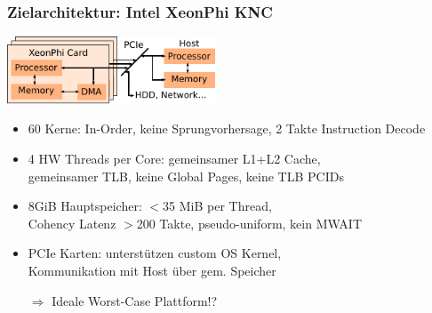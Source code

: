\begin{frame}
  \frametitle{Zielarchitektur: Intel XeonPhi KNC}

  \begin{center}
    \includegraphics[height=2cm]{figures/hw-xeonphi-host}
  \end{center}

  \begin{itemize}
  \item 60 Kerne: In-Order, keine Sprungvorhersage, 2 Takte Instruction Decode
  \item 4 HW Threads per Core: gemeinsamer L1+L2 Cache,\\ 
    gemeinsamer TLB, keine Global Pages, keine TLB PCIDs 
  \item 8GiB Hauptspeicher: $<$35 MiB per Thread,\\
    Cohency Latenz $>$200 Takte, pseudo-uniform, kein MWAIT
  \item PCIe Karten: unterstützen custom OS Kernel,\\
    Kommunikation mit Host über gem. Speicher
  \item[$\Rightarrow$] \alert{Ideale Worst-Case Plattform!?}
  \end{itemize}
\end{frame}

